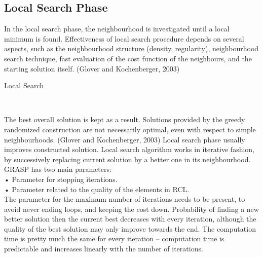 \documentclass[12pt]{article}
\begin{document}
\subsection {Local Search Phase}

In the local search phase, the neighbourhood is investigated until a local minimum is found. Effectiveness of local search procedure depends on several aspects, such as the neighbourhood structure (density, regularity), neighbourhood search technique, fast evaluation of the cost function of the neighbours, and the starting solution itself. (Glover and Kochenberger, 2003)

\begin{algorithm}
\caption{ Local Search}
\\
\begin {algorithmic}
\EndWhile
\State {}

\end{algorithmic}
\end{algorithm}

The best overall solution is kept as a result. Solutions provided by the greedy randomized construction are not necessarily optimal, even with respect to simple neighbourhoods. (Glover and Kochenberger, 2003) Local search phase usually improves constructed solution. Local search algorithm works in iterative fashion, by successively replacing current solution by a better one in its neighbourhood.\\
GRASP has two main parameters:\\
\indent •	Parameter for stopping iterations.\\
\indent•	Parameter related to the quality of the elements in RCL.\\
The parameter for the maximum number of iterations needs to be present, to avoid never ending loops, and keeping the cost down.
Probability of finding a new better solution then the current best decreases with every iteration, although the quality of the best solution may only improve towards the end. The computation time is pretty much the same for every iteration – computation time is predictable and increases linearly with the number of iterations.
\end{document}
